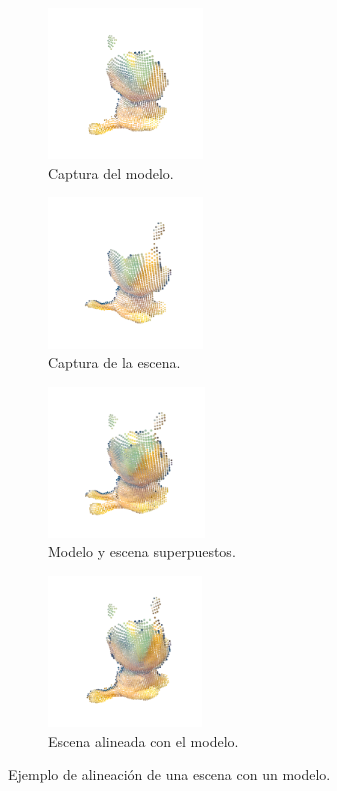 \begin{figure}[h]
    \centering
    \begin{subfigure}[t]{0.33\textheight}
    	\centering
        \includegraphics[height=4cm]{archivos/metodo-registro-explicacion-modelo-2.png}
        \caption{Captura del modelo.}
        \label{fig:metodo-registro-explicacion-modelo}
    \end{subfigure}
    \begin{subfigure}[t]{0.33\textheight}
    	\centering
        \includegraphics[height=4cm]{archivos/metodo-registro-explicacion-escena-2.png}
        \caption{Captura de la escena.}
        \label{fig:metodo-registro-explicacion-escena}
    \end{subfigure}
    \begin{subfigure}[t]{0.33\textheight}
    	\centering
        \includegraphics[height=4cm]{archivos/metodo-registro-explicacion-superpuesto-2.png}
        \caption{Modelo y escena superpuestos.}
        \label{fig:metodo-registro-explicacion-superpuesto}
    \end{subfigure}
    \begin{subfigure}[t]{0.33\textheight}
    	\centering
        \includegraphics[height=4cm]{archivos/metodo-registro-explicacion-alineacion-2.png}
        \caption{Escena alineada con el modelo.}
        \label{fig:metodo-registro-explicacion-alineacion}
    \end{subfigure}
    \caption{Ejemplo de alineación de una escena con un modelo.}
    \label{fig:metodo-registro-explicacion}
\end{figure}

